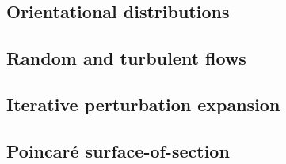 \documentclass[thesis.tex]{subfiles}
\begin{document}
\begin{figure}
\begin{center}
\end{center}
\caption{\label{fig:bmap} }%
\end{figure}


\subsection{Orientational distributions}

\subsection{Random and turbulent flows}

\subsection{Iterative perturbation expansion}

\subsection{Poincar\'e surface-of-section}
\end{document}
